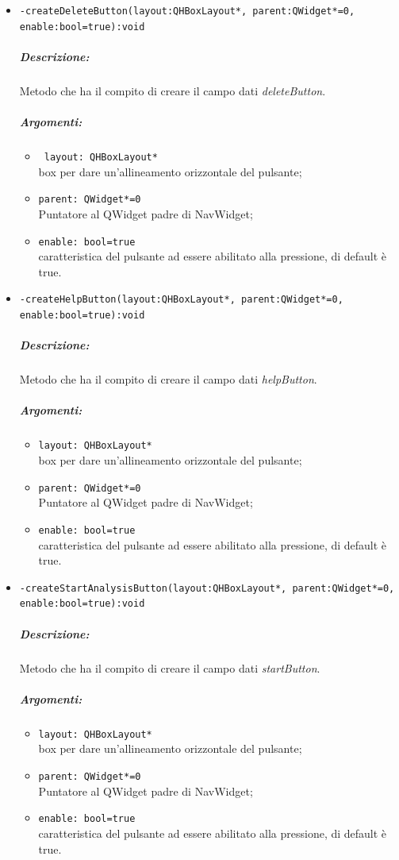 \begin{itemize}
\item \color{blue}\verb!-createDeleteButton(layout:QHBoxLayout*, parent:QWidget*=0, enable:bool=true):void!
\color{black}
\subparagraph{Descrizione: } Metodo che ha il compito di creare il campo dati \emph{deleteButton}.
\subparagraph{Argomenti:}
\begin{itemize}
\item \color{RoyalPurple} \verb! layout: QHBoxLayout*! \\ box per dare un'allineamento orizzontale del pulsante;
\item  \color{RoyalPurple} \verb!parent: QWidget*=0 ! \\ Puntatore al QWidget padre di NavWidget;
\item  \color{RoyalPurple} \verb!enable: bool=true! \\ caratteristica del pulsante ad essere abilitato alla pressione, di default è true.
\end{itemize}
\item \color{blue}\verb!-createHelpButton(layout:QHBoxLayout*, parent:QWidget*=0, enable:bool=true):void!
\color{black}
\subparagraph{Descrizione:} Metodo che ha il compito di creare il campo dati \emph{helpButton}.
\subparagraph{Argomenti:}
\begin{itemize}
\item  \color{RoyalPurple} \verb!layout: QHBoxLayout*! \\ box per dare un'allineamento orizzontale del pulsante;
\item  \color{RoyalPurple} \verb!parent: QWidget*=0  !\\ Puntatore al QWidget padre di NavWidget;
\item  \color{RoyalPurple} \verb!enable: bool=true !\\ caratteristica del pulsante ad essere abilitato alla pressione, di default è true.
\end{itemize}

\item \color{blue}\verb!-createStartAnalysisButton(layout:QHBoxLayout*, parent:QWidget*=0, enable:bool=true):void!
\color{black}
\subparagraph{Descrizione:} Metodo che ha il compito di creare il campo dati \emph{startButton}.
\subparagraph{Argomenti:}
\begin{itemize}
\item  \color{RoyalPurple} \verb!layout: QHBoxLayout*! \\ box per dare un'allineamento orizzontale del pulsante;
\item  \color{RoyalPurple} \verb!parent: QWidget*=0 ! \\ Puntatore al QWidget padre di NavWidget;
\item  \color{RoyalPurple} \verb!enable: bool=true !\\ caratteristica del pulsante ad essere abilitato alla pressione, di default è true.
\end{itemize}


\end{itemize}
